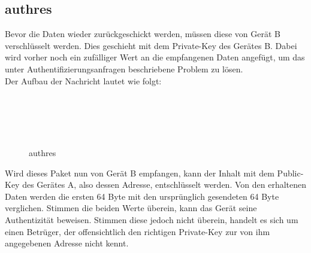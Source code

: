 \subsection{\gls{authres}}
Bevor die Daten wieder zurückgeschickt werden, müssen diese von Gerät B verschlüsselt werden. Dies geschieht mit dem Private-Key des Gerätes B. Dabei wird vorher noch ein zufälliger Wert an die empfangenen Daten angefügt, um das unter Authentifizierungsanfragen beschriebene Problem zu lösen.\\
Der Aufbau der Nachricht lautet wie folgt:
\begin{figure}[H]
\begin{centering}

\begin{bytefield}[bitwidth=3em]{8}
	\\
	 \\
	
	\begin{rightwordgroup}{\isprotomsgtype}
	\end{rightwordgroup} \\
	
	\begin{rightwordgroup}{\isprotomsgdata}
	\end{rightwordgroup}
	
\end{bytefield}

\par\end{centering}
\protect\caption{\gls{authres}}
\end{figure}
Wird dieses Paket nun von Gerät B empfangen, kann der Inhalt mit dem Public-Key des Gerätes A, also dessen Adresse, entschlüsselt werden. Von den erhaltenen Daten werden die ersten 64 Byte mit den ursprünglich gesendeten 64 Byte verglichen. Stimmen die beiden Werte überein, kann das Gerät seine Authentizität beweisen. Stimmen diese jedoch nicht überein, handelt es sich um einen Betrüger, der offensichtlich den richtigen Private-Key zur von ihm angegebenen Adresse nicht kennt.
		
